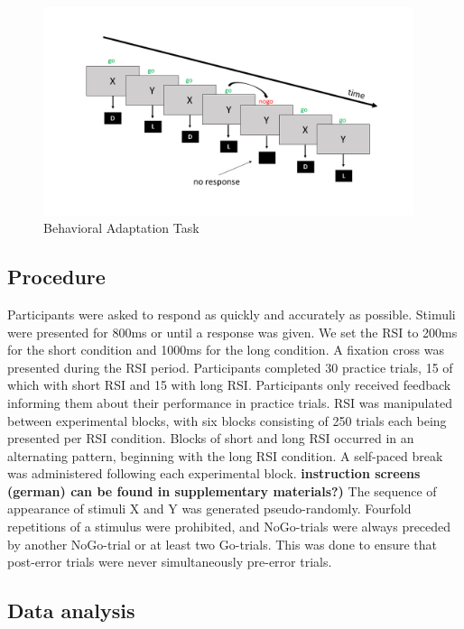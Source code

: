 \documentclass[
  man,floatsintext]{apa7}
\begin{document}
\begin{figure}
\includegraphics[width=4.27in]{images/bat_slide_pp/Slide1} \caption{Behavioral Adaptation Task}\label{fig:bat-example}
\end{figure}

\hypertarget{procedure}{%
\subsection{Procedure}\label{procedure}}

Participants were asked to respond as quickly and accurately as possible. Stimuli were presented for 800ms or until a response was given. We set the RSI to 200ms for the short condition and 1000ms for the long condition. A fixation cross was presented during the RSI period. Participants completed 30 practice trials, 15 of which with short RSI and 15 with long RSI. Participants only received feedback informing them about their performance in practice trials. RSI was manipulated between experimental blocks, with six blocks consisting of 250 trials each being presented per RSI condition. Blocks of short and long RSI occurred in an alternating pattern, beginning with the long RSI condition. A self-paced break was administered following each experimental block. \textbf{instruction screens (german) can be found in supplementary materials?)} The sequence of appearance of stimuli X and Y was generated pseudo-randomly. Fourfold repetitions of a stimulus were prohibited, and NoGo-trials were always preceded by another NoGo-trial or at least two Go-trials. This was done to ensure that post-error trials were never simultaneously pre-error trials.

\hypertarget{data-analysis}{%
\subsection{Data analysis}\label{data-analysis}}
\end{document}
